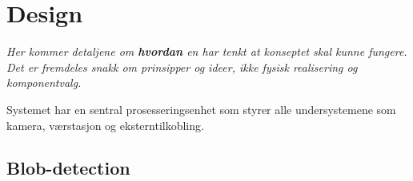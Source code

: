 \section{Design}
\label{sec:design}
\textit{Her kommer detaljene om \textbf{hvordan} en har tenkt at konseptet skal kunne fungere. Det er fremdeles snakk om prinsipper og ideer, ikke fysisk realisering og komponentvalg.}

Systemet har en sentral prosesseringsenhet som styrer alle undersystemene som kamera, værstasjon og eksterntilkobling. 


\subsection{Blob-detection}




\subsection{}